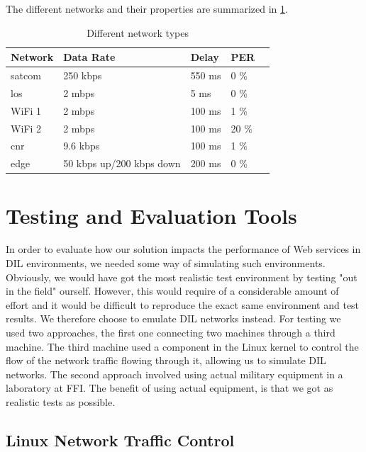 The different networks and their properties are summarized in
\cref{table-network-types}.

\begin{table}[h]
\begin{tabular}{| l | l | l | l | l |}
\hline
  \textbf{Network} & \textbf{Data Rate} & \textbf{Delay} & \textbf{PER} \\ \hline
  \gls{satcom} & 250 kbps & 550 ms & 0 \% \\ \hline
  \gls{los} & 2 mbps & 5 ms & 0 \% \\ \hline
  WiFi 1 & 2 mbps & 100 ms & 1 \% \\ \hline
  WiFi 2 & 2 mbps & 100 ms & 20 \% \\ \hline
  \gls{cnr} & 9.6 kbps & 100 ms & 1 \% \\ \hline
  \gls{edge} & 50 kbps up/200 kbps down & 200 ms & 0 \% \\ \hline
\end{tabular}
\caption{Different network types}
\label{table-network-types}
\end{table}


\section{Testing and Evaluation Tools}

In order to evaluate how our solution impacts the performance of Web services in
DIL environments, we needed some way of simulating such environments. Obviously,
we would have got the most realistic test environment by testing "out in the
field" ourself. However, this would require of a considerable amount of effort
and it would be difficult to reproduce the exact same environment and test
results. We therefore choose to emulate DIL networks instead. For testing we used
two approaches, the first one connecting two machines through a third machine.
The third machine used a component in the Linux kernel to control the flow
of the network traffic flowing through it, allowing us to simulate DIL networks.
The second approach involved using actual military equipment in a laboratory at
FFI. The benefit of using actual equipment, is that we got as realistic tests as
possible.


\subsection{Linux Network Traffic Control}

